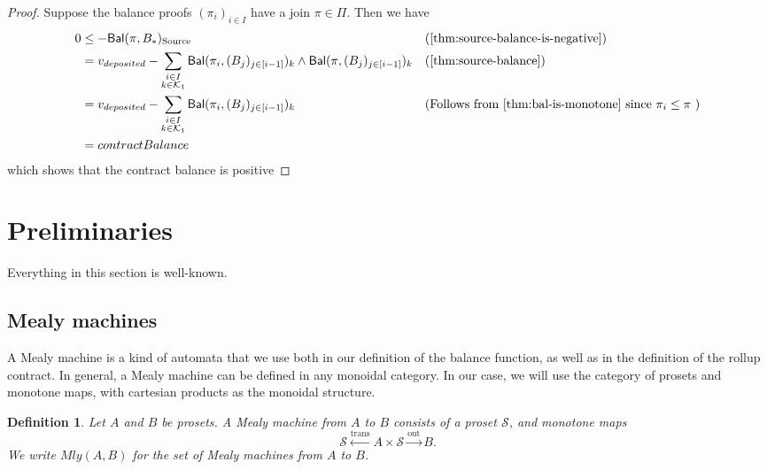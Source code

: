 \documentclass[runningheads]{llncs}
\newtheorem{defn}{Definition}
\newcommand{\source}{\text{Source}}
\newcommand{\K}{\mathcal{K}}
\renewcommand{\S}{\mathcal{S}}
\newcommand{\mly}[2]{Mly(#1, #2)}
\begin{document}
\begin{proof}
  Suppose the balance proofs \((\pi_i)_{i \in I}\) have
  a join \(\pi \in \Pi\). Then we have
  \begin{align*}
    0 & \leq - \mathsf{Bal}(\pi,B_*)_\source      &  &
    \text{(\cref{thm:source-balance-is-negative})} \\
    & = v_{deposited} - \sum_{\substack{i \in I
    \\ k \in \K_1}} \mathsf{Bal}(\pi_i,(B_j)_{j \in [i-1]})_k \wedge
    \mathsf{Bal}(\pi,(B_j)_{j \in [i-1]})_k &&
    \text{(\cref{thm:source-balance})} \\
    & = v_{deposited} - \sum_{\substack{i \in I
    \\ k \in \K_1}} \mathsf{Bal}(\pi_i,(B_j)_{j \in [i-1]})_k &&
    \text{(Follows from \Cref{thm:bal-is-monotone} since \(\pi_i \leq
    \pi\) )} \\
    & = contractBalance
  \end{align*} which shows that the contract balance is positive
\end{proof}

\newpage

\section{Preliminaries}

Everything in this section is well-known.

\subsection{Mealy machines}

A Mealy machine is a kind of automata that we use both in our
definition of the balance function, as well as in the definition of
the rollup contract. In general, a Mealy machine can be defined in
any monoidal category. In our case, we will use the category of
prosets and monotone maps, with cartesian products as the
monoidal structure.

\begin{defn}
  Let \(A\) and \(B\) be prosets. A \emph{Mealy machine} from
  \(A\) to \(B\) consists of a proset \(\S\), and monotone
  maps \[\S \xleftarrow{\text{trans}} A \times \S
  \xrightarrow{\text{out}} B.\] We write \(\mly{A}{B}\) for the set
  of Mealy machines from \(A\) to \(B\).
\end{defn}
\end{document}
